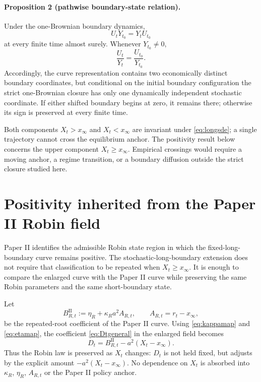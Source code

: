 \documentclass[11pt]{article}
\numberwithin{equation}{section}
\begin{document}
\paragraph{Proposition 2 (pathwise boundary-state relation).}
Under the one-Brownian boundary dynamics,
\begin{equation}
 U_tY_{t_0}=Y_tU_{t_0}
 \label{eq:pathwiseboundaryrelation}
\end{equation}
at every finite time almost surely. Whenever $Y_{t_0}\neq0$,
\begin{equation}
 \frac{U_t}{Y_t}=\frac{U_{t_0}}{Y_{t_0}}.
 \label{eq:constantboundaryratio}
\end{equation}
Accordingly, the curve representation contains two economically distinct boundary coordinates, but conditional on the initial boundary configuration the strict one-Brownian closure has only one dynamically independent stochastic coordinate. If either shifted boundary begins at zero, it remains there; otherwise its sign is preserved at every finite time.

Both components $X_t>x_\infty$ and $X_t<x_\infty$ are invariant under \eqref{eq:longsde}; a single trajectory cannot cross the equilibrium anchor. The positivity result below concerns the upper component $X_t\geq x_\infty$. Empirical crossings would require a moving anchor, a regime transition, or a boundary diffusion outside the strict closure studied here.

\section{Positivity inherited from the Paper II Robin field}

Paper II identifies the admissible Robin state region in which the fixed-long-boundary curve remains positive. The stochastic-long-boundary extension does not require that classification to be repeated when $X_t\geq x_\infty$. It is enough to compare the enlarged curve with the Paper II curve while preserving the same Robin parameters and the same short-boundary state.

Let
\begin{equation}
 B_{R,t}^{\mathrm{II}}:=\eta_R+\kappa_Ra^2A_{R,t},
 \qquad A_{R,t}=r_t-x_\infty,
\end{equation}
be the repeated-root coefficient of the Paper II curve. Using \eqref{eq:kappamap} and \eqref{eq:etamap}, the coefficient \eqref{eq:Dtgeneral} in the enlarged field becomes
\begin{equation}
 D_t=B_{R,t}^{\mathrm{II}}-a^2(X_t-x_\infty).
 \label{eq:Dtpositivity}
\end{equation}
Thus the Robin law is preserved as $X_t$ changes: $D_t$ is not held fixed, but adjusts by the explicit amount $-a^2(X_t-x_\infty)$. No dependence on $X_t$ is absorbed into $\kappa_R$, $\eta_R$, $A_{R,t}$ or the Paper II policy anchor.
\end{document}
